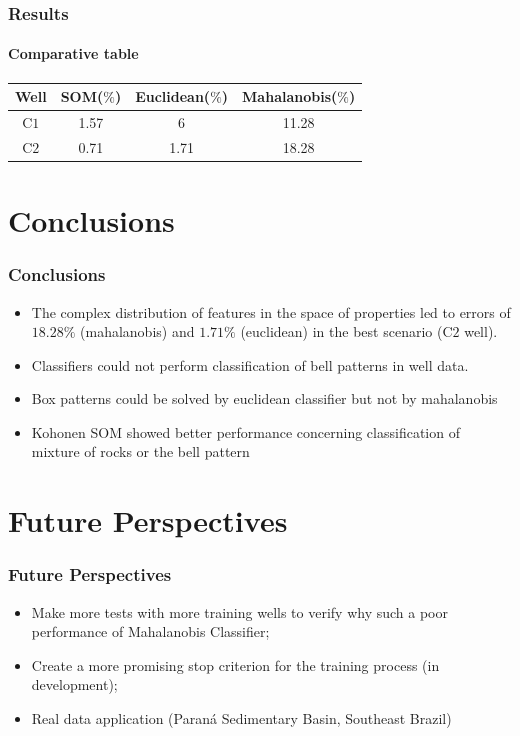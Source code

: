 \documentclass[aspectratio=10]{beamer} %
\begin{document}
\begin{frame}
	\frametitle{Results}
	\framesubtitle{Comparative table}
		\begin{table}[H]
			\centering
			\begin{tabular}{||c|c|c|c||}
				\hline
Well &  SOM($\%$) & Euclidean($\%$) & Mahalanobis($\%$)\\ [0.5ex] \hline\hline 
C$1$	  &  1.57      &     6           &    11.28   \\
\hline
C$2$     &  0.71      &    1.71         &    18.28    \\ [1ex] 
\hline
			\end{tabular}
			\label{codigos}
            \end{table}
\end{frame}

\section{Conclusions}

\begin{frame}
	\frametitle{Conclusions}
	\begin{itemize}
		\item The complex distribution of features in the space of properties led to errors of $18.28\%$ (mahalanobis) and $1.71\%$ (euclidean) in the best scenario (C$2$ well).
		\pause
		\item Classifiers could not perform classification of bell patterns in well data. 
		\pause
		\item Box patterns could be solved by euclidean classifier but not by mahalanobis
		\pause
		\item Kohonen SOM showed better performance concerning classification of mixture of rocks or the bell pattern
	\end{itemize}
\end{frame}

\section{Future Perspectives}

\begin{frame}
	\frametitle{Future Perspectives}
	\begin{itemize}
		\pause
		\item Make more tests with more training wells to verify why such a poor performance of Mahalanobis Classifier;
		\pause
		\item Create a more promising stop criterion for the training process (in development);
		\pause
		\item Real data application (Paraná Sedimentary Basin, Southeast Brazil)
	\end{itemize}
\end{frame}
\end{document}

